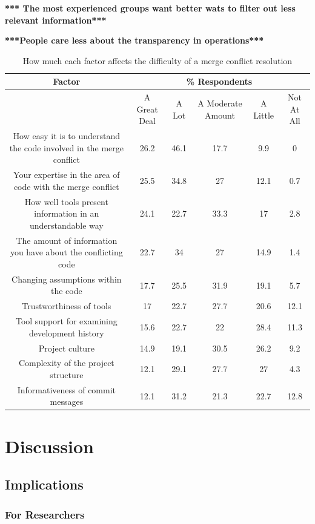 \documentclass[conference]{IEEEtran}
\begin{document}
\textbf{*** The most experienced groups want better wats to filter out less relevant information***}

\textbf{***People care less about the transparency in operations***}

\begin{table}[!t]
\renewcommand{\arraystretch}{1.3}
\caption{How much each factor affects the difficulty of a merge conflict resolution}
\label{percent_res_diff_table}
\centering
\begin{tabular}{c|c|c|c|c|c}
\hline
Factor & \multicolumn{5}{c}{ \% Respondents}\\
\hline
& A Great Deal & A Lot & A Moderate Amount & A Little & Not At All\\
\hline
How easy it is to understand the code involved in the merge conflict & 26.2 & 46.1 & 17.7 & 9.9 & 0\\
Your expertise in the area of code with the merge conflict & 25.5 & 34.8 & 27 & 12.1 & 0.7\\
How well tools present information in an understandable way & 24.1 & 22.7 & 33.3 & 17 & 2.8\\
The amount of information you have about the conflicting code & 22.7 & 34 & 27 & 14.9 & 1.4\\
Changing assumptions within the code & 17.7 & 25.5 & 31.9 & 19.1 & 5.7\\
Trustworthiness of tools & 17 & 22.7 & 27.7 & 20.6 & 12.1\\
Tool support for examining development history & 15.6 & 22.7 & 22 & 28.4 & 11.3\\
Project culture & 14.9 & 19.1 & 30.5 & 26.2 & 9.2\\
Complexity of the project structure & 12.1 & 29.1 & 27.7 & 27 & 4.3\\
Informativeness of commit messages & 12.1 & 31.2 & 21.3 & 22.7 & 12.8\\
\hline
\end{tabular}
\end{table}

\section{Discussion}
\subsection{Implications}
\subsubsection{For Researchers}
\end{document}
